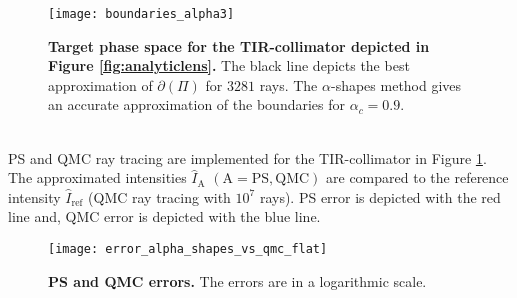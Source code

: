  \begin{figure}[h]
  \begin{center}
       \texttt{[image: boundaries\_alpha3]}
   \end{center}
        \caption{\textbf{Target phase space for the TIR-collimator depicted in
        Figure \ref{fig:analyticlens}.} The black line depicts the best approximation of $\partial$$(\Pi)$ for $3281$ rays. 
The $\alpha$-shapes method gives an accurate approximation of the boundaries for $\alpha_c = 0.9$.}
  \label{fig:Tir2}
\end{figure}
\\ \indent PS and QMC ray tracing are implemented for the TIR-collimator in Figure \ref{fig:Tir2}. The approximated intensities $\hat{I}_{\textrm{A}}$ $(\textrm{A} = \textrm{PS}, \textrm{QMC})$ are compared to the reference intensity $\hat{I}_{\textrm{ref}}$ (QMC ray tracing with $10^7$ rays).
PS error is depicted with the red line and, QMC error is depicted with the blue line. \\ \indent
\begin{figure}[t]
 \begin{center}
   \texttt{[image: error\_alpha\_shapes\_vs\_qmc\_flat]}
    \end{center}
     \caption{\textbf{PS and QMC errors.} The errors are in a logarithmic scale.}
 \label{fig:error2}
\end{figure}
